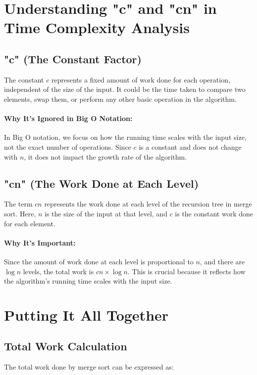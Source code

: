 \documentclass{article}
\begin{document}
\section*{Understanding "c" and "cn" in Time Complexity Analysis}

\subsection*{"c" (The Constant Factor)}
The constant \( c \) represents a fixed amount of work done for each operation, independent of the size of the input. It could be the time taken to compare two elements, swap them, or perform any other basic operation in the algorithm.

\paragraph{Why It's Ignored in Big O Notation:}
In Big O notation, we focus on how the running time scales with the input size, not the exact number of operations. Since \( c \) is a constant and does not change with \( n \), it does not impact the growth rate of the algorithm.

\subsection*{"cn" (The Work Done at Each Level)}
The term \( cn \) represents the work done at each level of the recursion tree in merge sort. Here, \( n \) is the size of the input at that level, and \( c \) is the constant work done for each element.

\paragraph{Why It's Important:}
Since the amount of work done at each level is proportional to \( n \), and there are \( \log n \) levels, the total work is \( cn \times \log n \). This is crucial because it reflects how the algorithm's running time scales with the input size.

\section*{Putting It All Together}

\subsection*{Total Work Calculation}
The total work done by merge sort can be expressed as:
\end{document}

